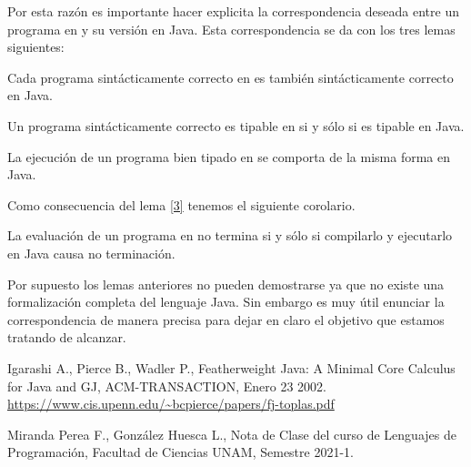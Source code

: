 \documentclass[12pt]{extarticle}
\begin{document}
Por esta razón es importante hacer explicita la correspondencia deseada entre un programa en \jpp y su versión en Java. Esta correspondencia se da con los tres lemas siguientes:

\begin{lemma}Cada programa sintácticamente correcto en \jpp es también sintácticamente correcto en Java.
\end{lemma}

\begin{lemma} Un programa sintácticamente correcto es tipable en \jpp si y sólo si es tipable en Java.
\end{lemma}

\begin{lemma}\label{3}La ejecución de un programa bien tipado en \jpp se comporta de la misma forma en Java.
\end{lemma}

Como consecuencia del lema \ref{3} tenemos el siguiente corolario.

\begin{corollary} La evaluación de un programa en \jpp no termina si y sólo si compilarlo y ejecutarlo en Java causa no terminación.
\end{corollary}

Por supuesto los lemas anteriores no pueden demostrarse ya que no existe una formalización completa del lenguaje Java. Sin embargo es muy útil enunciar la correspondencia de manera precisa para dejar en claro el objetivo que estamos tratando de alcanzar. 
\begin{thebibliography}{9}
\label{pierce}
Igarashi A., Pierce B., Wadler P., Featherweight Java: A Minimal Core Calculus for Java and GJ, ACM-TRANSACTION, Enero 23 2002. \url{https://www.cis.upenn.edu/~bcpierce/papers/fj-toplas.pdf}

Miranda Perea F., González Huesca L., Nota de Clase del curso de Lenguajes de Programación, Facultad de Ciencias UNAM, Semestre 2021-1.

\end{thebibliography}
\end{document}

